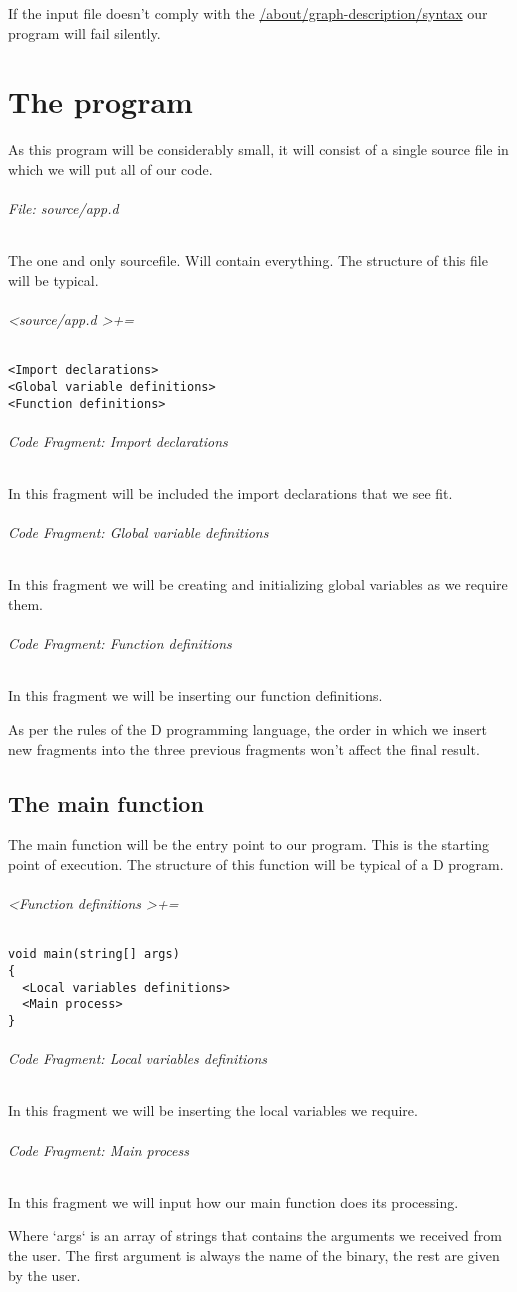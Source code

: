 \documentclass{book}
\begin{document}
If the input file doesn't comply with the \hypertarget{link2}{\hyperlink{/about/graph-description/syntax}{/about/graph-description/syntax}} our program will fail silently. 
\chapter{The program}
\hypertarget{/program}{}
As this program will be considerably small, it will consist of a single source file 
in which we will put all of our code. 
\subparagraph{\emph{File: source/app.d}}
The one and only sourcefile. Will contain everything. 
The structure of this file will be typical. 
\subparagraph{\emph{\textless source/app.d \textgreater += }}
{
\color{teal}
\begin{verbatim}
<Import declarations>
<Global variable definitions>
<Function definitions>
\end{verbatim}
}
\subparagraph{\emph{Code Fragment: Import declarations}}
In this fragment will be included the import declarations that we see 
fit. 
\subparagraph{\emph{Code Fragment: Global variable definitions}}
In this fragment we will be creating and initializing global variables 
as we require them. 
\subparagraph{\emph{Code Fragment: Function definitions}}
In this fragment we will be inserting our function definitions. 

As per the rules of the D programming language, the order in which we insert new fragments 
into the three previous fragments won't affect the final result. 
\section{The main function}
\hypertarget{/program/main}{}
The main function will be the entry point to our program. This is the starting point of execution. 
The structure of this function will be typical of a D program. 
\subparagraph{\emph{\textless Function definitions \textgreater += }}
{
\color{teal}
\begin{verbatim}
void main(string[] args)
{
  <Local variables definitions>
  <Main process>
}
\end{verbatim}
}
\subparagraph{\emph{Code Fragment: Local variables definitions}}
In this fragment we will be inserting the local variables we require. 
\subparagraph{\emph{Code Fragment: Main process}}
In this fragment we will input how our main function does its processing. 

Where `args` is an array of strings that contains the arguments we received from the user. The first argument is always the name of the binary, 
the rest are given by the user. 
\end{document}
